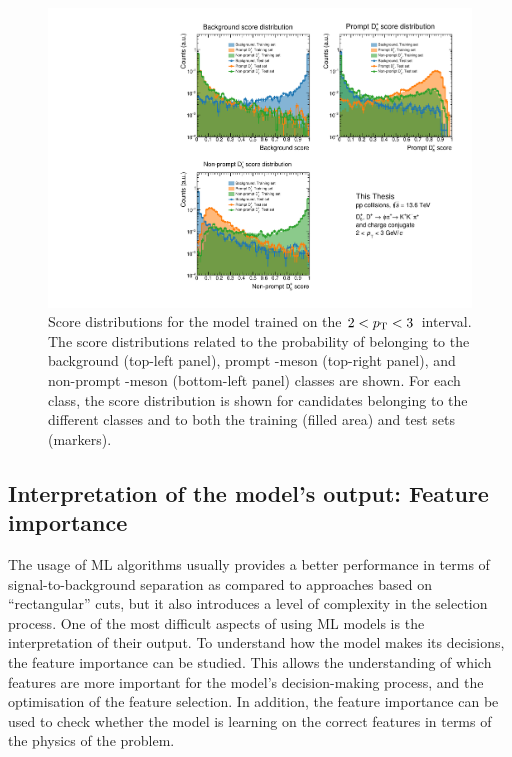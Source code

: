 \begin{figure}[p]
    \centering
    \includegraphics[width=\textwidth]{Figures/Chapter 5/Distributions.pdf}
    \caption{Score distributions for the model trained on the $2<p_\mathrm{T}<3$~\gevc interval. The score distributions related to the probability of belonging to the background (top-left panel), prompt \ds-meson (top-right panel), and non-prompt \ds-meson (bottom-left panel) classes are shown. For each class, the score distribution is shown for candidates belonging to the different classes and to both the training (filled area) and test sets (markers).}
    \label{fig:ml_score}
\end{figure}

\subsection{Interpretation of the model's output: Feature importance}
The usage of ML algorithms usually provides a better performance in terms of signal-to-background separation as compared to approaches based on ``rectangular'' cuts, but it also introduces a level of complexity in the selection process. One of the most difficult aspects of using ML models is the interpretation of their output. To understand how the model makes its decisions, the feature importance can be studied. This allows the understanding of which features are more important for the model's decision-making process, and the optimisation of the feature selection. In addition, the feature importance can be used to check whether the model is learning on the correct features in terms of the physics of the problem.

